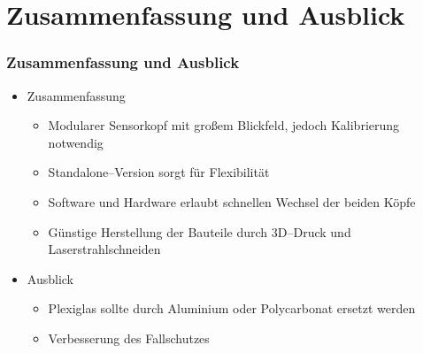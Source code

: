 \section{Zusammenfassung und Ausblick}

    \begin{frame}[t]
    \frametitle{Zusammenfassung und Ausblick}
    
    \begin{itemize}
    \item Zusammenfassung
      \begin{itemize}
	\item Modularer Sensorkopf mit gro\ss{}em Blickfeld, jedoch Kalibrierung notwendig
	\item Standalone--Version sorgt f\"ur Flexibilit\"at
	\item Software und Hardware erlaubt schnellen Wechsel der beiden K\"opfe
	\item G\"unstige Herstellung der Bauteile durch 3D--Druck und Laserstrahlschneiden
      \end{itemize}
      \item Ausblick
	\begin{itemize}
	 \item  Plexiglas sollte durch Aluminium oder Polycarbonat ersetzt werden
	 \item 	Verbesserung des Fallschutzes
	\end{itemize}
    \end{itemize}

	
      \end{frame}
